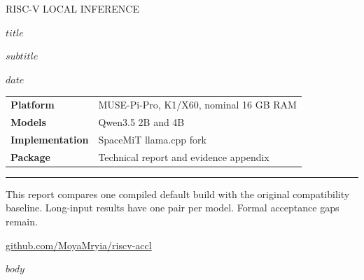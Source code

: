 \documentclass[10pt,a4paper]{article}
\begin{document}
\begin{titlepage}
\vspace*{15mm}
{\large\textcolor{reportblue}{RISC-V LOCAL INFERENCE}}\par
\vspace{12mm}
{\Huge\bfseries $title$\par}
\vspace{8mm}
{\Large $subtitle$\par}
\vspace{12mm}
{\large $date$\par}
\vspace{14mm}
\begin{tabular}{@{}ll@{}}
\textbf{Platform} & MUSE-Pi-Pro, K1/X60, nominal 16 GB RAM \\
\textbf{Models} & Qwen3.5 2B and 4B \\
\textbf{Implementation} & SpaceMiT llama.cpp fork \\
\textbf{Package} & Technical report and evidence appendix \\
\end{tabular}
\vfill
\textcolor{reportblue}{\rule{\textwidth}{1pt}}\par
This report compares one compiled default build with the original compatibility baseline.
Long-input results have one pair per model. Formal acceptance gaps remain.\par
\vspace{6mm}
\href{https://github.com/MoyaMryia/riscv-accl}{github.com/MoyaMryia/riscv-accl}
\end{titlepage}
{\small\tableofcontents}
\clearpage
$body$
\end{document}

